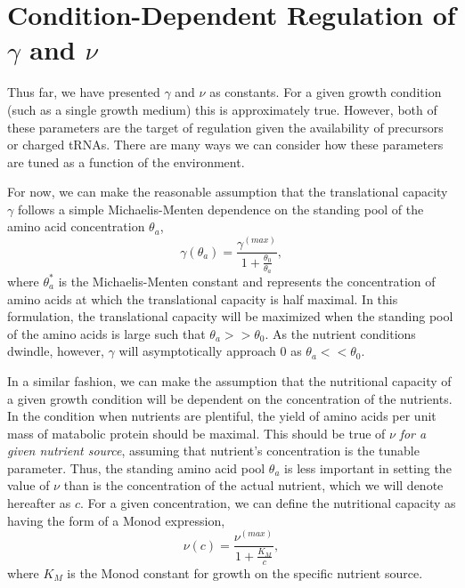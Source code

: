 \documentclass[letterpaper, 11pt]{article}
\begin{document}
\section{Condition-Dependent Regulation of $\gamma$ and $\nu$}
Thus far, we have presented $\gamma$ and $\nu$ as constants. For a given growth
condition (such as a single growth medium) this is approximately true. However,
both of these parameters are the target of regulation given the availability of
precursors or charged tRNAs. There are many ways we can consider how these
parameters are tuned as a function of the environment. 

For now, we can make the reasonable assumption that the translational
capacity $\gamma$ follows a simple Michaelis-Menten dependence on the
standing pool of the amino acid concentration $\theta_a$,
\begin{equation}
\gamma(\theta_a) = \frac{\gamma^{(max)}}{1 + \frac{\theta_0}{\theta_a}},
\label{eq:gamma_michaelis_menten}
\end{equation}
where $\theta_a^*$ is the Michaelis-Menten constant and represents the
concentration of amino acids at which the translational capacity is half
maximal. In this formulation, the translational capacity will be maximized when 
the standing pool of the amino acids is large such that $\theta_a >> \theta_0$.
As the nutrient conditions dwindle, however, $\gamma$ will asymptotically
approach $0$ as $\theta_a <<  \theta_0$.

In a similar fashion, we can make the assumption that the nutritional capacity 
of a given growth condition will be dependent on the concentration of the
nutrients. In the condition when nutrients are plentiful, the yield of amino
acids  per unit mass of matabolic protein should be maximal. This should be true
of $\nu$ \textit{for a given nutrient source}, assuming that nutrient's
concentration is the tunable parameter. Thus, the standing amino acid pool
$\theta_a$ is less important in setting the value of $\nu$ than is the
concentration of the actual nutrient, which we will denote hereafter as $c$. For
a given concentration, we can define the nutritional capacity as having the form
of a Monod expression, 
\begin{equation}
\nu(c) = \frac{\nu^{(max)}}{1 + \frac{K_M}{c}},
\label{eq:nu_monod}
\end{equation}
where $K_M$ is the Monod constant for growth on the specific nutrient source. 
\end{document}
